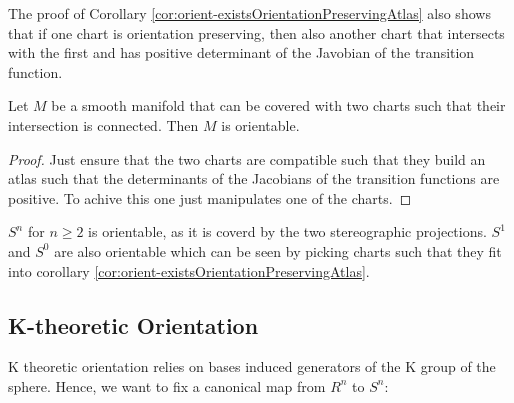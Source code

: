 \begin{corollary} \label{cor:orient-transitionFunctionPositiveDeterminantAlsoOrientationPreserving}
    The proof of Corollary \ref{cor:orient-existsOrientationPreservingAtlas} also shows that if one chart is orientation preserving, then also another chart that intersects with the first and has positive determinant of the Javobian of the transition function.
\end{corollary}

\begin{lemma}
    Let $M$ be a smooth manifold that can be covered with two charts such that their intersection is connected. Then $M$ is orientable.
\end{lemma}
\begin{proof}
    Just ensure that the two charts are compatible such that they build an atlas such that the determinants of the Jacobians of the transition functions are positive. To achive this one just manipulates one of the charts.
\end{proof}
\begin{corollary}
    $S^n$ for $n\geq 2$ is orientable, as it is coverd by the two stereographic projections. $S^1$ and $S^0$ are also orientable which can be seen by picking charts such that they fit into corollary \ref{cor:orient-existsOrientationPreservingAtlas}.
\end{corollary}







\subsection{K-theoretic Orientation}
K theoretic orientation relies on bases induced generators of the K group of the sphere. Hence, we want to fix a canonical map from $R^n$ to $S^n$:



